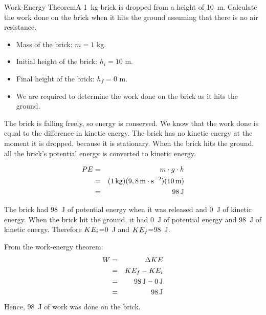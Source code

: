 \begin{wex}{Work-Energy Theorem}{A 1~kg brick is dropped from a height of 10~m. Calculate the work done on the brick when it hits the ground assuming that there is no air resistance.}
{
\begin{itemize}
\item Mass of the brick: $m = 1$ kg.
\item Initial height of the brick: $h_i=10$ m.
\item Final height of the brick: $h_f=0$ m.
\item We are required to determine the work done on the brick as it hits the ground.
\end{itemize}

The brick is falling freely, so energy is conserved. We know that the work done is equal to the difference in kinetic energy. The brick has no kinetic energy at the moment it is dropped, because it is stationary. When the brick hits the ground, all the brick's potential energy is converted to kinetic energy.

\begin{eqnarray*}
PE&=&m\cdot g \cdot h\\
&=&(1\,\mathrm{kg})(9,8\,\mathrm{m \cdot s^{-2}})(10\,\rm{m})\\
&=&98\,\mathrm{J}
\end{eqnarray*}

The brick had 98~J of potential energy when it was released and 0~J of kinetic energy. When the brick hit the ground, it had 0~J of potential energy and 98~J of kinetic energy. Therefore $KE_i$=0~J and $KE_f$=98~J.

From the work-energy theorem:
\begin{eqnarray*}
W&=&\Delta KE\\
&=&KE_f - KE_i\\
&=&98\,\mathrm{J}-0\,\mathrm{J}\\
&=&98\,\mathrm{J}
\end{eqnarray*}
Hence, 98~J of work was done on the brick.
}
\end{wex}

